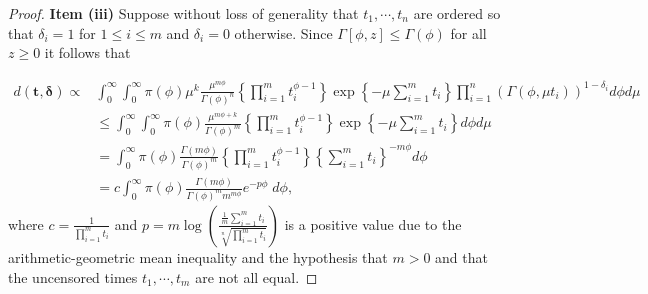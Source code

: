 \begin{proof}
\vspace{0.3cm}
\noindent \textbf{Item (iii)} Suppose without loss of generality that $t_1,\cdots,t_n$ are ordered so that $\delta_i=1$ for $1\leq i\leq m$ and $\delta_i=0$ otherwise. Since $\Gamma[\phi,z]\leq \Gamma(\phi)$ for all $z\geq 0$ it follows that


\begin{align*}
d(\boldsymbol{t,\delta})\propto &\int_{0}^{\infty}\int_{0}^{\infty}\pi(\phi)\mu^k\frac{\mu^{m\phi}}{\Gamma(\phi)^n}\left\{\prod_{i=1}^m{t_i^{\phi-1}}\right\}\exp\left\{-\mu\sum_{i=1}^m t_i\right\}\prod_{i=1}^n\left(\Gamma(\phi,\mu t_i)\right)^{1-\delta_i}d\phi d\mu \nonumber\\
&\leq \int_{0}^{\infty}\int_{0}^{\infty}\pi(\phi)\frac{\mu^{m\phi+k}}{\Gamma(\phi)^m}\left\{\prod_{i=1}^m{t_i^{\phi-1}}\right\}\exp\left\{-\mu\sum_{i=1}^m t_i\right\}d\phi d\mu \nonumber\\
&= \int_{0}^{\infty}\pi(\phi)\frac{\Gamma(m\phi)}{\Gamma(\phi)^m}\left\{\prod_{i=1}^m{t_i^{\phi-1}}\right\}\left\{\sum_{i=1}^m t_i\right\}^{-m\phi} d\phi \nonumber \\
&= c \int_{0}^{\infty}\pi(\phi)\frac{\Gamma(m\phi)}{\Gamma(\phi)^m m^{m \phi}}e^{-p\phi}\; d\phi,
\end{align*}
where $c = \frac{1}{\prod_{i=1}^m t_i}$ 
and $p = m \log\left(\frac{\frac{1}{m}\sum_{i=1}^m t_i}{\sqrt[n]{\prod_{i=1}^m t_i}}\right)$ is a positive value due to the arithmetic-geometric mean inequality and the hypothesis that $m>0$ and that the uncensored times $t_1,\cdots,t_m$ are not all equal.


\end{proof}
